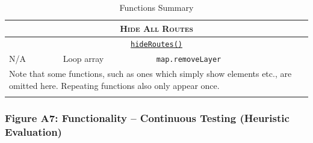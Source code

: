 \documentclass[11pt, english]{article}
\begin{document}
\begin{center}
\begin{longtable}{p{4cm}p{6cm}p{2cm}}
		\hline
		\multicolumn{3}{c}{\textsc{Hide All Routes}}\\
		\hline
		\multicolumn{3}{c}{\underline{\texttt{hideRoutes()}}}\\
		N/A & Loop array & \texttt{map.removeLayer}\\
		\hline
		\multicolumn{3}{p{14cm}}{Note that some functions, such as ones which simply show elements etc., are omitted here. Repeating functions also only appear once.}\\
		\hline
		\caption{Functions Summary}
	\end{longtable}
	\end{center}

\newpage

		\subsubsection*{Figure A7: Functionality -- Continuous Testing (Heuristic Evaluation)}
\end{document}
